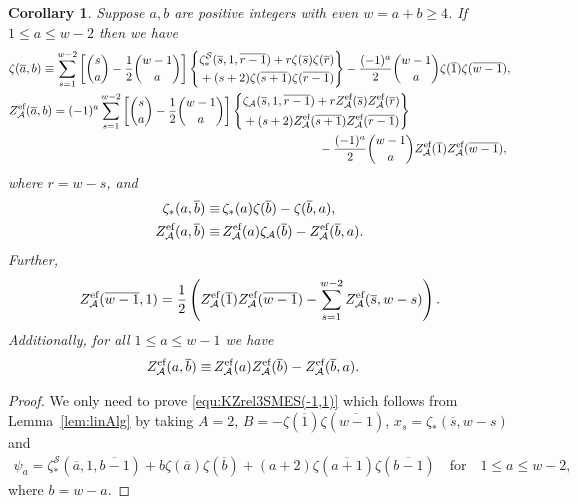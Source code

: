 \documentclass{article}
\newcommand{\Sy}{{\mathcal S}}
\newcommand{\calA}{\mathcal{A}}
\newcommand{\eff}{\text{\rm{ef}}}
\newcommand{\ol}{\overline}
\theoremstyle{plain}
\newtheorem{cor}[thm]{Corollary}
\theoremstyle{definition}
\begin{document}
\begin{cor}\label{cor:KZeffDBES(-1,1)}
Suppose $a,b$ are positive integers with even $w=a+b\ge 4$. If $1\le a\le w-2$ then we have
\begin{align}
&\zeta(\ol{a},b)\equiv
 \sum_{s=1}^{w-2} \left[ \binom{s}{a}-\frac12\binom{w-1}{a}\right]
\left\{\aligned
&\zeta_\ast^\Sy(\ol{s},1,\ol{r-1})+r\zeta(\ol{s})\zeta(\ol{r})\\
&+(s+2)\zeta(\ol{s+1})\zeta(\ol{r-1})
\endaligned \right\}
-\frac{(-1)^a }2\binom{w-1}{a}\zeta(\ol{1})\zeta(\ol{w-1}) ,  \label{equ:KZrel3SMES(-1,1)}\\
&Z_\calA^\eff(\ol{a},b)=
 (-1)^a \sum_{s=1}^{w-2} \left[ \binom{s}{a}-\frac12\binom{w-1}{a}\right]
\left\{\aligned
&\zeta_\calA(\ol{s},1,\ol{r-1})+rZ_\calA^\eff(\ol{s})Z_\calA^\eff(\ol{r})\\
&+(s+2)Z_\calA^\eff(\ol{s+1})Z_\calA^\eff(\ol{r-1})
\endaligned \right\} \notag\\
&\hskip9cm-\frac{(-1)^a }2\binom{w-1}{a}Z_\calA^\eff(\ol{1})Z_\calA^\eff(\ol{w-1}) ,  \label{equ:KZrel3FES(-1,1)}
\end{align}
where $r=w-s$, and
\begin{align} \label{equ:KZrel1SMES(1,-1)}
\zeta_\ast(a,\ol{b})\equiv &\, \zeta_\ast(a)\zeta(\ol{b})-\zeta(\ol{b},a),\\
Z_\calA^\eff(a,\ol{b})\equiv &\, Z_\calA^\eff(a)\zeta_\calA(\ol{b})-Z_\calA^\eff(\ol{b},a).\label{equ:KZrel2FES(1,-1)}
\end{align}
Further,
\begin{equation} \label{equ:KZrel3SMES(1,-1)}
Z_\calA^\eff(\ol{w-1},1) = \frac12\left( Z_\calA^\eff(\ol{1})Z_\calA^\eff(\ol{w-1})-\sum_{s=1}^{w-2}  Z_\calA^\eff(\ol{s},w-s)\right).
\end{equation}
Additionally, for all $1\le a\le w-1$ we have
\begin{align} \label{equ:KZrel3SMES(1,-1)2}
Z_\calA^\eff(a,\ol{b})\equiv &\, Z_\calA^\eff(a)Z_\calA^\eff(\ol{b})-Z_\calA^\eff(\ol{b},a).
\end{align}
\end{cor}

\begin{proof}
We only need to prove \eqref{equ:KZrel3SMES(-1,1)} which follows from Lemma~\ref{lem:linAlg} by taking $A=2$, $B=-\zeta(\ol{1})\zeta(\ol{w-1}) $,
$x_s=\zeta_*(\ol{s},w-s)$ and
\begin{align*}
\psi_a=\zeta_\ast^\Sy(\ol{a},1,\ol{b-1})
   +b\zeta(\ol{a})\zeta(\ol{b})
            +(a+2)\zeta(\ol{a+1})\zeta(\ol{b-1}) \quad \text{for}\quad 1\le a\le w-2,
\end{align*}
where $b=w-a$.
\end{proof}
\end{document}
